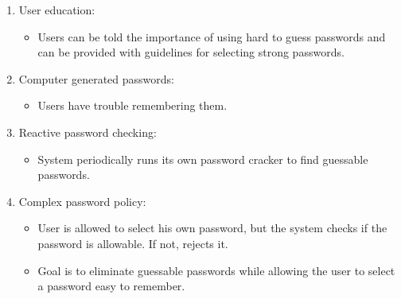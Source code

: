 \documentclass{article}
\begin{document}
                        \begin{enumerate}
                            \item User education:
                            \begin{itemize}
                                \item Users can be told the importance of using hard to guess passwords and can be provided with guidelines for selecting strong passwords.
                            \end{itemize}
                            \item Computer generated passwords:
                            \begin{itemize}
                                \item Users have trouble remembering them.
                            \end{itemize}
                            \item Reactive password checking:
                            \begin{itemize}
                                \item System periodically runs its own password cracker to find guessable passwords.
                            \end{itemize}
                            \item Complex password policy:
                            \begin{itemize}
                                \item User is allowed to select his own password, but the system checks if the password is allowable. If not, rejects it.
                                \item Goal is to eliminate guessable passwords while allowing the user to select a password easy to remember.
                            \end{itemize}
                        \end{enumerate}
\end{document}
